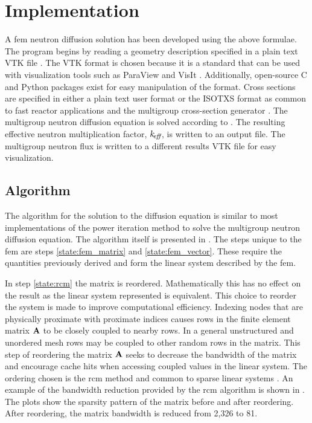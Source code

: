 \section{Implementation}
  A \gls{fem} neutron diffusion solution has been developed using 
  the above formulae. The program begins by reading a geometry description 
  specified in a plain text VTK file \cite{vtk}. The VTK format is chosen 
  because it is a standard that can be used with visualization tools such as 
  ParaView \cite{ParaView} and VisIt \cite{VisIt}. Additionally, open-source C 
  and Python packages exist for easy manipulation of the format. Cross sections
  are specified in either a plain text user format or the ISOTXS format as 
  common to fast reactor applications and the multigroup cross-section generator
  \mcc \cite{mcc}. The multigroup neutron diffusion equation is solved according
  to . The resulting effective neutron multiplication 
  factor, $k_{\!\mbox{\scriptsize \em eff}}$, is written to an output file. The multigroup neutron flux is
  written to a different results VTK file for easy visualization.

  \subsection{Algorithm}
    The algorithm for the solution to the diffusion equation is similar to most
    implementations of the power iteration method to solve the multigroup
    neutron diffusion equation. The algorithm itself is presented in 
    . The steps unique to the \gls{fem} are 
    steps \ref{state:fem_matrix} and \ref{state:fem_vector}. These require the 
    quantities previously derived and form the linear system described by the 
    \gls{fem}. 

    In step \ref{state:rcm} the matrix is reordered. Mathematically this has no
    effect on the result as the linear system represented is equivalent. This 
    choice to reorder the system is made to improve computational efficiency. 
    Indexing nodes that are physically proximate with proximate indices causes 
    rows in the finite element matrix $\mathbf{A}$ to be closely coupled to nearby
    rows. In a general unstructured and unordered mesh rows may be coupled to 
    other random rows in the matrix. This step of reordering the matrix $\mathbf{A}$ 
    seeks to decrease the bandwidth of the matrix and encourage cache hits when
    accessing coupled values in the linear system. The ordering chosen is the
    \gls{rcm} method and common to sparse linear systems
    \cite{rcm}. An example of the bandwidth reduction provided by the \gls{rcm}
    algorithm is shown in . The plots show the
    sparsity pattern of the matrix before and after reordering. After
    reordering, the matrix bandwidth is reduced from 2,326 to 81.

